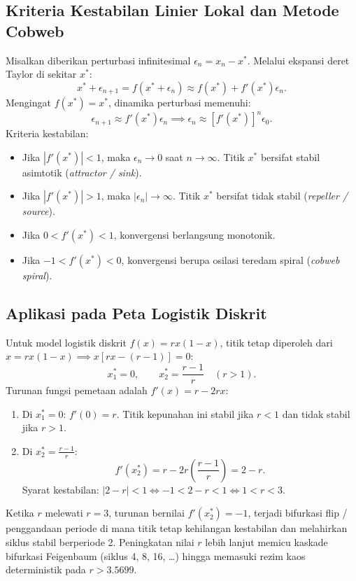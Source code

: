\documentclass{bukumjh}
\begin{document}
\subsection{Kriteria Kestabilan Linier Lokal dan Metode Cobweb}
Misalkan diberikan perturbasi infinitesimal $\epsilon_n = x_n - x^\ast$. Melalui ekspansi deret Taylor di sekitar $x^\ast$:
\[
x^\ast + \epsilon_{n+1} = f(x^\ast + \epsilon_n) \approx f(x^\ast) + f'(x^\ast)\epsilon_n.
\]
Mengingat $f(x^\ast) = x^\ast$, dinamika perturbasi memenuhi:
\[
\epsilon_{n+1} \approx f'(x^\ast)\epsilon_n \implies \epsilon_n \approx [f'(x^\ast)]^n \epsilon_0.
\]
Kriteria kestabilan:
\begin{itemize}
    \item Jika $|f'(x^\ast)| < 1$, maka $\epsilon_n \to 0$ saat $n \to \infty$. Titik $x^\ast$ bersifat {\jsg stabil asimtotik} (\textit{attractor / sink}).
    \item Jika $|f'(x^\ast)| > 1$, maka $|\epsilon_n| \to \infty$. Titik $x^\ast$ bersifat {\jsg tidak stabil} (\textit{repeller / source}).
    \item Jika $0 < f'(x^\ast) < 1$, konvergensi berlangsung monotonik.
    \item Jika $-1 < f'(x^\ast) < 0$, konvergensi berupa osilasi teredam spiral (\textit{cobweb spiral}).
\end{itemize}

\subsection{Aplikasi pada Peta Logistik Diskrit}
Untuk model logistik diskrit $f(x) = r x (1 - x)$, titik tetap diperoleh dari $x = r x (1 - x) \implies x[rx - (r - 1)] = 0$:
\[
x_1^\ast = 0, \qquad x_2^\ast = \frac{r-1}{r} \quad (r > 1).
\]
Turunan fungsi pemetaan adalah $f'(x) = r - 2rx$:
\begin{enumerate}
    \item Di $x_1^\ast = 0$: $f'(0) = r$. Titik kepunahan ini stabil jika $r < 1$ dan tidak stabil jika $r > 1$.
    \item Di $x_2^\ast = \frac{r-1}{r}$: 
    \[
    f'(x_2^\ast) = r - 2r\left(\frac{r-1}{r}\right) = 2 - r.
    \]
    Syarat kestabilan: $|2 - r| < 1 \iff -1 < 2 - r < 1 \iff 1 < r < 3$.
\end{enumerate}
Ketika $r$ melewati $r = 3$, turunan bernilai $f'(x_2^\ast) = -1$, terjadi {\jsg bifurkasi flip / penggandaan periode} di mana titik tetap kehilangan kestabilan dan melahirkan siklus stabil berperiode 2. Peningkatan nilai $r$ lebih lanjut memicu kaskade bifurkasi Feigenbaum (siklus 4, 8, 16, \dots) hingga memasuki rezim {\jsg kaos deterministik} pada $r > 3.5699$.
\[
\]
\end{document}
